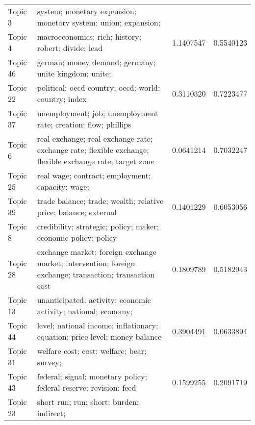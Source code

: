 \documentclass[
  12pt,
  onecolumn]{article}
\begin{document}
\begin{longtable}[t]{llrr}
\endfoot
\bottomrule
\endlastfoot
Topic 3 & system;
monetary
expansion;
monetary
system;
union;
expansion;
\cellcolor{gray!6}{stability} & \cellcolor{gray!6}{0.9071399} & \cellcolor{gray!6}{1.1293765}\\
Topic 4 & macroeconomics;
rich;
history;
robert;
divide;
lead & 1.1407547 & 0.5540123\\
Topic 46 & german;
money
demand;
germany;
unite
kingdom;
unite;
\cellcolor{gray!6}{kingdom} & \cellcolor{gray!6}{0.6243111} & \cellcolor{gray!6}{0.6198704}\\
Topic 22 & political;
oecd
country;
oecd;
world;
country;
index & 0.3110320 & 0.7223477\\
Topic 37 & unemployment;
job;
unemployment
rate;
creation;
flow;
phillips
\cellcolor{gray!6}{curve} & \cellcolor{gray!6}{0.4662997} & \cellcolor{gray!6}{0.5280369}\\
\addlinespace
Topic 6 & real
exchange;
real
exchange
rate;
exchange
rate;
flexible
exchange;
flexible
exchange
rate;
target
zone & 0.0641214 & 0.7032247\\
Topic 25 & real
wage;
contract;
employment;
capacity;
wage;
\cellcolor{gray!6}{stickiness} & \cellcolor{gray!6}{0.2083779} & \cellcolor{gray!6}{0.5475815}\\
Topic 39 & trade
balance;
trade;
wealth;
relative
price;
balance;
external & 0.1401229 & 0.6053056\\
Topic 8 & credibility;
strategic;
policy;
maker;
economic
policy;
policy
\cellcolor{gray!6}{rule} & \cellcolor{gray!6}{0.4678103} & \cellcolor{gray!6}{0.2403548}\\
Topic 28 & exchange
market;
foreign
exchange
market;
intervention;
foreign
exchange;
transaction;
transaction
cost & 0.1809789 & 0.5182943\\
\addlinespace
Topic 13 & unanticipated;
activity;
economic
activity;
national;
economy;
\cellcolor{gray!6}{gap} & \cellcolor{gray!6}{0.1962931} & \cellcolor{gray!6}{0.4182108}\\
Topic 44 & level;
national
income;
inflationary;
equation;
price
level;
money
balance & 0.3904491 & 0.0633894\\
Topic 31 & welfare
cost;
cost;
welfare;
bear;
survey;
\cellcolor{gray!6}{household} & \cellcolor{gray!6}{0.4670256} & \cellcolor{gray!6}{-0.0926148}\\
Topic 43 & federal;
signal;
monetary
policy;
federal
reserve;
revision;
feed & 0.1599255 & 0.2091719\\
Topic 23 & short
run;
run;
short;
burden;
indirect;
\cellcolor{gray!6}{externality} & \cellcolor{gray!6}{0.0421424} & \cellcolor{gray!6}{0.3071523}\\

\end{longtable}
\end{document}
